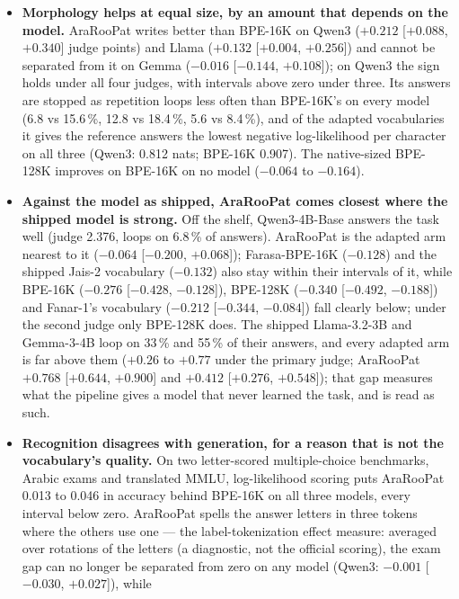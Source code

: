 \begin{itemize}
  \item \textbf{Morphology helps at equal size, by an amount that depends on the model.} AraRooPat writes better than
  BPE-16K on Qwen3 ($+0.212$ [$+0.088$, $+0.340$] judge points) and Llama ($+0.132$ [$+0.004$, $+0.256$]) and cannot be
  separated from it on Gemma ($-0.016$ [$-0.144$, $+0.108$]); on Qwen3 the sign holds under all four judges, with
  intervals above zero under three. Its answers are stopped as repetition loops
  \citep{holtzman2020curious,xu2022learning} less often than BPE-16K's on every model (6.8 vs 15.6\,\%, 12.8 vs
  18.4\,\%, 5.6 vs 8.4\,\%), and of the adapted vocabularies it gives the reference answers the lowest negative
  log-likelihood per character on all three (Qwen3: 0.812 nats; BPE-16K 0.907). The native-sized BPE-128K improves on
  BPE-16K on no model ($-0.064$ to $-0.164$).
  \item \textbf{Against the model as shipped, AraRooPat comes closest where the shipped model is strong.} Off the shelf,
  Qwen3-4B-Base answers the task well (judge 2.376, loops on 6.8\,\% of answers). AraRooPat is the adapted arm nearest
  to it ($-0.064$ [$-0.200$, $+0.068$]); Farasa-BPE-16K ($-0.128$) and the shipped Jais-2 vocabulary ($-0.132$) also
  stay within their intervals of it, while BPE-16K ($-0.276$ [$-0.428$, $-0.128$]), BPE-128K ($-0.340$ [$-0.492$,
  $-0.188$]) and Fanar-1's vocabulary ($-0.212$ [$-0.344$, $-0.084$]) fall clearly below; under the second judge only
  BPE-128K does. The shipped Llama-3.2-3B and Gemma-3-4B loop on 33\,\% and 55\,\% of their answers, and every adapted
  arm is far above them ($+0.26$ to $+0.77$ under the primary judge; AraRooPat $+0.768$ [$+0.644$, $+0.900$] and
  $+0.412$ [$+0.276$, $+0.548$]); that gap measures what the pipeline gives a model that never learned the task, and is
  read as such.
  \item \textbf{Recognition disagrees with generation, for a reason that is not the vocabulary's quality.} On two
  letter-scored multiple-choice benchmarks, Arabic exams and translated MMLU, log-likelihood scoring puts AraRooPat
  0.013 to 0.046 in accuracy behind BPE-16K on all three models, every interval below zero. AraRooPat spells the answer
  letters in three tokens where the others use one --- the label-tokenization effect
  \citet{sanz-guerrero-2025-mindthegap} measure: averaged over rotations of the letters (a diagnostic, not the official
  scoring), the exam gap can no longer be separated from zero on any model (Qwen3: $-0.001$ [$-0.030$, $+0.027$]), while

\end{itemize}
